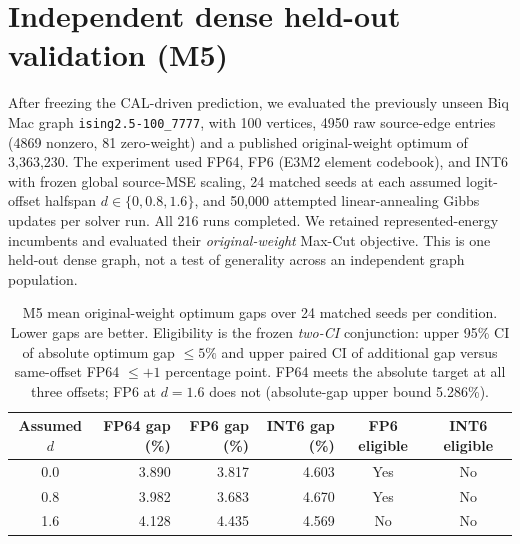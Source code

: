 \section{Independent dense held-out validation (M5)}
\label{sec:m5-heldout}
After freezing the CAL-driven prediction, we evaluated the previously
unseen Biq Mac graph \texttt{ising2.5-100\_7777}, with 100 vertices,
4950 raw source-edge entries (4869 nonzero, 81 zero-weight) and a
published original-weight optimum of 3,363,230. The experiment used
FP64, FP6 (E3M2 element codebook), and INT6 with frozen global
source-MSE scaling, 24 matched seeds at each assumed logit-offset
halfspan $d\in\{0,0.8,1.6\}$, and 50,000 attempted linear-annealing
Gibbs updates per solver run. All 216 runs completed. We retained
represented-energy incumbents and evaluated their \emph{original-weight}
Max-Cut objective. This is one held-out dense graph, not a test of
generality across an independent graph population.

\begin{table}[htbp]\centering\small
\begin{tabular}{@{}c rrr cc@{}}\toprule
Assumed $d$ & FP64 gap (\%) & FP6 gap (\%) & INT6 gap (\%)
 & FP6 eligible & INT6 eligible\\\midrule
0.0 & 3.890 & 3.817 & 4.603 & Yes & No\\
0.8 & 3.982 & 3.683 & 4.670 & Yes & No\\
1.6 & 4.128 & 4.435 & 4.569 & No & No\\\bottomrule
\end{tabular}
\caption{M5 mean original-weight optimum gaps over 24 matched seeds
per condition. Lower gaps are better. Eligibility is the frozen
\emph{two-CI} conjunction: upper 95\% CI of absolute optimum gap
$\leq5\%$ and upper paired CI of additional gap versus same-offset
FP64 $\leq+1$ percentage point. FP64 meets the absolute target
at all three offsets; FP6 at $d=1.6$ does not
(absolute-gap upper bound 5.286\%).}
\label{tab:m5-quality}
\end{table}

